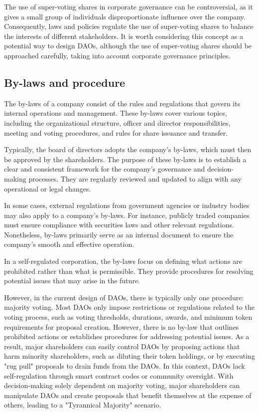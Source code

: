 \documentclass[main.tex]{subfiles}
\begin{document}
The use of super-voting shares in corporate governance can be controversial, as it gives a small group of individuals disproportionate influence over the company. Consequently, laws and policies regulate the use of super-voting shares to balance the interests of different stakeholders. It is worth considering this concept as a potential way to design DAOs, although the use of super-voting shares should be approached carefully, taking into account corporate governance principles.

\subsection{By-laws and procedure}

The by-laws of a company consist of the rules and regulations that govern its internal operations and management. These by-laws cover various topics, including the organizational structure, officer and director responsibilities, meeting and voting procedures, and rules for share issuance and transfer.

Typically, the board of directors adopts the company's by-laws, which must then be approved by the shareholders. The purpose of these by-laws is to establish a clear and consistent framework for the company's governance and decision-making processes. They are regularly reviewed and updated to align with any operational or legal changes.

In some cases, external regulations from government agencies or industry bodies may also apply to a company's by-laws. For instance, publicly traded companies must ensure compliance with securities laws and other relevant regulations. Nonetheless, by-laws primarily serve as an internal document to ensure the company's smooth and effective operation.

In a self-regulated corporation, the by-laws focus on defining what actions are prohibited rather than what is permissible. They provide procedures for resolving potential issues that may arise in the future.

However, in the current design of DAOs, there is typically only one procedure: majority voting. Most DAOs only impose restrictions or regulations related to the voting process, such as voting thresholds, durations, awards, and minimum token requirements for proposal creation. However, there is no by-law that outlines prohibited actions or establishes procedures for addressing potential issues. As a result, major shareholders can easily control DAOs by proposing actions that harm minority shareholders, such as diluting their token holdings, or by executing "rug pull" proposals to drain funds from the DAOs. In this context, DAOs lack self-regulation through smart contract codes or community oversight. With decision-making solely dependent on majority voting, major shareholders can manipulate DAOs and create proposals that benefit themselves at the expense of others, leading to a "Tyrannical Majority" scenario.
\end{document}
